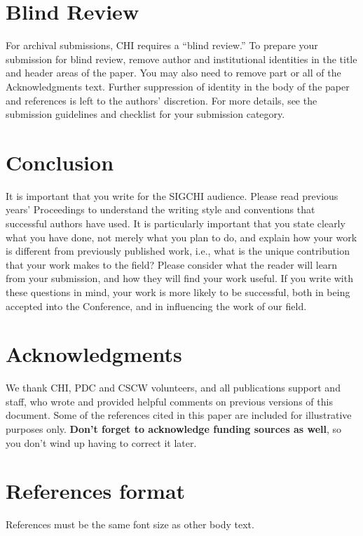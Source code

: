 \documentclass{sigchi}
\begin{document}
\section{Blind Review}

For archival submissions, CHI requires a ``blind review.'' To prepare
your submission for blind review, remove author and institutional
identities in the title and header areas of the paper. You may also
need to remove part or all of the Acknowledgments text.  Further
suppression of identity in the body of the paper and references is
left to the authors' discretion. For more details, see the submission
guidelines and checklist for your submission category.

\section{Conclusion}

It is important that you write for the SIGCHI audience.  Please read
previous years' Proceedings to understand the writing style and
conventions that successful authors have used.  It is particularly
important that you state clearly what you have done, not merely what
you plan to do, and explain how your work is different from previously
published work, i.e., what is the unique contribution that your work
makes to the field?  Please consider what the reader will learn from
your submission, and how they will find your work useful.  If you
write with these questions in mind, your work is more likely to be
successful, both in being accepted into the Conference, and in
influencing the work of our field.

\section{Acknowledgments}

We thank CHI, PDC and CSCW volunteers, and all publications support
and staff, who wrote and provided helpful comments on previous
versions of this document.  Some of the references cited in this paper
are included for illustrative purposes only.  \textbf{Don't forget
to acknowledge funding sources as well}, so you don't wind up
having to correct it later.

%
%
%
%
%
\balance

\section{References format}
References must be the same font size as other body text.



\end{document}
